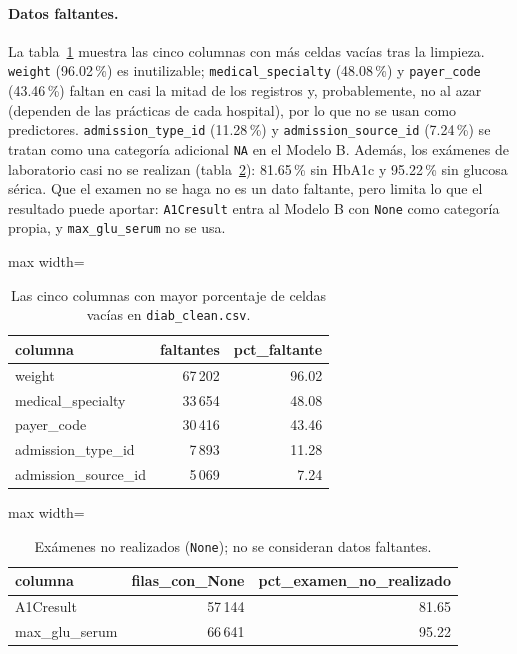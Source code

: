 \documentclass[11pt,a4paper]{article}
\newcommand{\cod}[1]{\texttt{#1}}
\newenvironment{tablaentex}[2]{%
  \begin{table}[H]\centering\small\caption{#1}\label{#2}\begin{adjustbox}{max width=\textwidth}}%
  {\end{adjustbox}\end{table}}
\begin{document}
\paragraph{Datos faltantes.} La tabla~\ref{tab:falt} muestra las cinco columnas con más celdas vacías tras la limpieza. \cod{weight} (96.02\,\%) es inutilizable; \cod{medical\_specialty} (48.08\,\%) y \cod{payer\_code} (43.46\,\%) faltan en casi la mitad de los registros y, probablemente, no al azar (dependen de las prácticas de cada hospital), por lo que no se usan como predictores. \cod{admission\_type\_id} (11.28\,\%) y \cod{admission\_source\_id} (7.24\,\%) se tratan como una categoría adicional \cod{NA} en el Modelo B. Además, los exámenes de laboratorio casi no se realizan (tabla~\ref{tab:noexam}): 81.65\,\% sin HbA1c y 95.22\,\% sin glucosa sérica. Que el examen no se haga no es un dato faltante, pero limita lo que el resultado puede aportar: \cod{A1Cresult} entra al Modelo B con \cod{None} como categoría propia, y \cod{max\_glu\_serum} no se usa.
\begin{tablaentex}{Las cinco columnas con mayor porcentaje de celdas vacías en \cod{diab\_clean.csv}.}{tab:falt}
\begin{tabular}{lrr}
\toprule
columna & faltantes & pct\_faltante \\
\midrule
weight & 67\,202 & 96.02 \\
medical\_specialty & 33\,654 & 48.08 \\
payer\_code & 30\,416 & 43.46 \\
admission\_type\_id & 7\,893 & 11.28 \\
admission\_source\_id & 5\,069 & 7.24 \\
\bottomrule
\end{tabular}
\end{tablaentex}
\begin{tablaentex}{Exámenes no realizados (\cod{None}); no se consideran datos faltantes.}{tab:noexam}
\begin{tabular}{lrr}
\toprule
columna & filas\_con\_None & pct\_examen\_no\_realizado \\
\midrule
A1Cresult & 57\,144 & 81.65 \\
max\_glu\_serum & 66\,641 & 95.22 \\
\bottomrule
\end{tabular}
\end{tablaentex}
\end{document}
